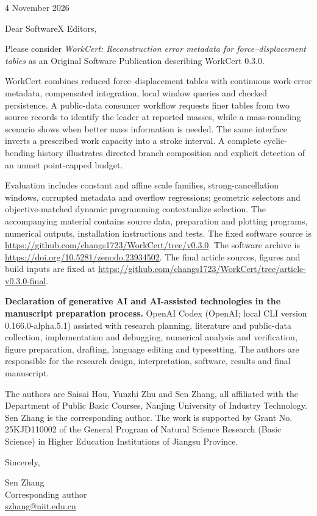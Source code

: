 \documentclass[11pt,a4paper]{article}
\begin{document}
4 November 2026

Dear SoftwareX Editors,

Please consider \emph{WorkCert: Reconstruction error metadata for force--displacement tables} as an Original Software Publication describing WorkCert 0.3.0.

WorkCert combines reduced force--displacement tables with continuous work-error metadata, compensated integration, local window queries and checked persistence. A public-data consumer workflow requests finer tables from two source records to identify the leader at reported masses, while a mass-rounding scenario shows when better mass information is needed. The same interface inverts a prescribed work capacity into a stroke interval. A complete cyclic-bending history illustrates directed branch composition and explicit detection of an unmet point-capped budget.

Evaluation includes constant and affine scale families, strong-cancellation windows, corrupted metadata and overflow regressions; geometric selectors and objective-matched dynamic programming contextualize selection. The accompanying material contains source data, preparation and plotting programs, numerical outputs, installation instructions and tests. The fixed software source is \url{https://github.com/changs1723/WorkCert/tree/v0.3.0}. The software archive is \url{https://doi.org/10.5281/zenodo.23934502}.  The final article sources, figures and build inputs are fixed at \url{https://github.com/changs1723/WorkCert/tree/article-v0.3.0-final}. 

\textbf{Declaration of generative AI and AI-assisted technologies in the manuscript preparation process.} OpenAI Codex (OpenAI; local CLI version 0.166.0-alpha.5.1) assisted with research planning, literature and public-data collection, implementation and debugging, numerical analysis and verification, figure preparation, drafting, language editing and typesetting. The authors are responsible for the research design, interpretation, software, results and final manuscript.

The authors are Saisai Hou, Yunzhi Zhu and Sen Zhang, all affiliated with the Department of Public Basic Courses, Nanjing University of Industry Technology. Sen Zhang is the corresponding author. The work is supported by Grant No. 25KJD110002 of the General Program of Natural Science Research (Basic Science) in Higher Education Institutions of Jiangsu Province.

Sincerely,

Sen Zhang\\Corresponding author\\\href{mailto:szhang@niit.edu.cn}{szhang@niit.edu.cn}
\end{document}

